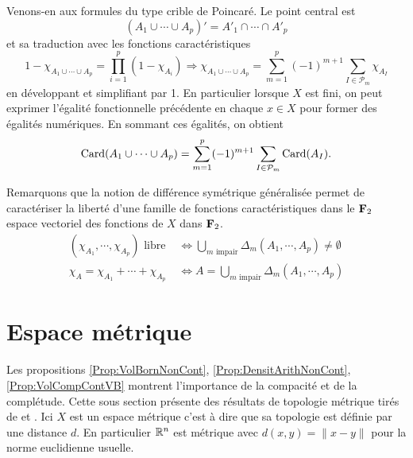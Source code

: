 \noindent Venons-en aux formules du type crible de Poincaré. Le point central est
\begin{displaymath}
  (A_1 \cup \cdots \cup A_p)' = A'_1 \cap \cdots \cap A'_p
\end{displaymath}
et sa traduction avec les fonctions caractéristiques
\begin{displaymath}
  1 - \chi_{A_1 \cup \cdots \cup A_p} = \prod_{i=1}^p(1 - \chi_{A_i})
  \Rightarrow
  \chi_{A_1 \cup \cdots \cup A_p} = \sum_{m=1}^p (-1)^{m+1}\sum_{I \in \mathcal{P}_m}\chi_{A_I}
\end{displaymath}
en développant et simplifiant par 1.\newline
En particulier lorsque $X$ est fini, on peut exprimer l'égalité fonctionnelle précédente en chaque $x\in X$ pour former des égalités numériques. En sommant ces égalités, on obtient
\begin{displaymath}
  \mathop{\mathrm{Card}}(A_1 \cup \cdots \cup A_p) = \sum_{m=1}^p (-1)^{m+1}\sum_{I \in \mathcal{P}_m}\mathop{\mathrm{Card}}(A_I).
\end{displaymath}

\noindent Remarquons que la notion de différence symétrique généralisée permet de caractériser la liberté d'une famille de fonctions caractéristiques dans le $\mathbf{F}_2$ espace vectoriel des fonctions de $X$ dans $\mathbf{F}_2$.
\begin{align*}
  (\chi_{A_1}, \cdots, \chi_{A_p}) \text{ libre } &\Leftrightarrow \bigcup_{m \text{ impair}} \Delta_m(A_1, \cdots, A_p) \not = \emptyset \\
  \chi_A = \chi_{A_1} + \cdots + \chi_{A_p} &\Leftrightarrow A = \bigcup_{m \text{ impair}} \Delta_m(A_1, \cdots, A_p)
\end{align*}


\section{Espace métrique} \label{Sec:EspMetric}
Les propositions \ref{Prop:VolBornNonCont}, \ref{Prop:DensitArithNonCont}, \ref{Prop:VolCompContVB} montrent l'importance de la compacité et de la complétude. Cette sous section présente des résultats de topologie métrique tirés de \cite{dieudonne1969elements} et \cite{koblitz2012p}.\newline
Ici $X$ est un espace métrique c'est à dire que sa topologie est définie par une distance $d$. En particulier $\mathbb{R}^n$ est métrique avec $d(x,y)=\| x-y\|$ pour la norme euclidienne usuelle.

